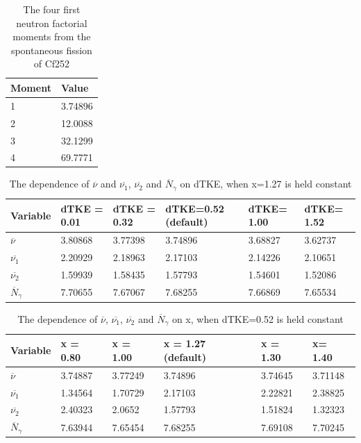 \documentclass[]{article}
\begin{document}
\begin{table} [H]
	\centering
	\caption{The four first neutron factorial moments from the spontaneous fission of Cf252}
	\begin{tabularx}{\textwidth}{XX} \hline
		\label{tab:Cf252_n_moments}
		Moment & Value \\ \hline
		1 & 3.74896 \\
		2 & 12.0088\\
		3 & 32.1299\\
		4 & 69.7771\\ 
	\end{tabularx}
\end{table}

\begin{table} [H]
	\centering
	\caption{The dependence of $\overline{\nu}$  and $\overline{\nu_1}$, $\overline{\nu_2}$ and $\overline{N}_{\gamma}$ on dTKE, when x=1.27 is held constant}
	\begin{tabularx}{\textwidth}{XXXXXX} \hline
		\label{tab:dependence_on_dTKE}
		Variable & dTKE = 0.01&dTKE = 0.32 &dTKE=0.52 (default) & dTKE= 1.00 & dTKE= 1.52\\ \hline
		$\overline{\nu}$ & 3.80868 & 3.77398 & 3.74896 & 3.68827 & 3.62737\\
		$\overline{\nu_1}$ & 2.20929 & 2.18963  & 2.17103& 2.14226 & 2.10651 \\
		$\overline{\nu_2}$ & 1.59939 &1.58435 & 1.57793 & 1.54601 &  1.52086\\ 
		$\overline{N}_{\gamma}$ & 7.70655 & 7.67067 & 7.68255 & 7.66869 & 7.65534\\
		\hline
	\end{tabularx}
\end{table}

\begin{table} [H]
	\centering
	\caption{The dependence of $\overline{\nu}$, $\overline{\nu_1}$, $\overline{\nu_2}$ and $\overline{N}_{\gamma}$ on x, when dTKE=0.52 is held constant}
	\begin{tabularx}{\textwidth}{XXXXXX} \hline
		\label{tab:dependence_on_x}
		Variable & x = 0.80 & x  = 1.00 & x = 1.27 (default) & x = 1.30 & x= 1.40\\ \hline
		$\overline{\nu}$ & 3.74887 & 3.77249 & 3.74896 & 3.74645 & 3.71148\\
		$\overline{\nu_1}$ & 1.34564 & 1.70729  & 2.17103 & 2.22821 & 2.38825 \\
		$\overline{\nu_2}$ & 2.40323  & 2.0652 & 1.57793 & 1.51824 & 1.32323 \\ 
		$\overline{N}_{\gamma}$ & 7.63944 & 7.65454 & 7.68255 & 7.69108 & 7.70245\\
		\hline
	\end{tabularx}
\end{table}
\end{document}
